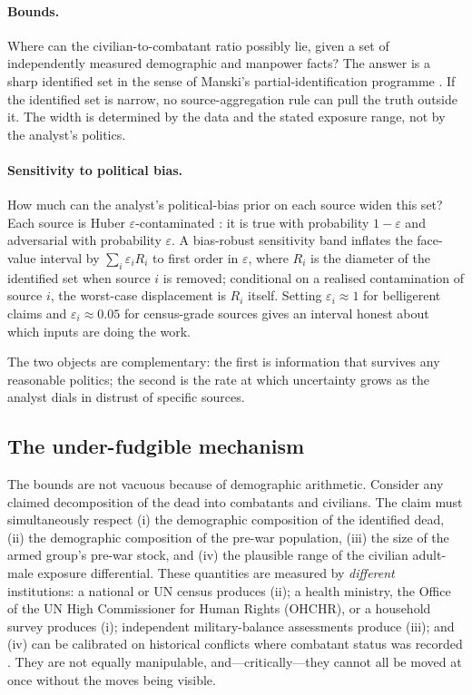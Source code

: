 \paragraph{Bounds.} Where can the civilian-to-combatant ratio possibly lie, given a set of independently measured demographic and manpower facts? The answer is a sharp identified set in the sense of Manski's partial-identification programme \citep{manski2003,tamer2010,romanoshaikh2010}. If the identified set is narrow, no source-aggregation rule can pull the truth outside it. The width is determined by the data and the stated exposure range, not by the analyst's politics.

\paragraph{Sensitivity to political bias.} How much can the analyst's political-bias prior on each source widen this set? Each source is Huber $\varepsilon$-contaminated \citep{huber1981,berger1986}: it is true with probability $1-\varepsilon$ and adversarial with probability $\varepsilon$. A bias-robust sensitivity band inflates the face-value interval by $\sum_i\varepsilon_i R_i$ to first order in $\varepsilon$, where $R_i$ is the diameter of the identified set when source $i$ is removed; conditional on a realised contamination of source $i$, the worst-case displacement is $R_i$ itself. Setting $\varepsilon_i\approx 1$ for belligerent claims and $\varepsilon_i\approx 0.05$ for census-grade sources gives an interval honest about which inputs are doing the work.

The two objects are complementary: the first is information that survives any reasonable politics; the second is the rate at which uncertainty grows as the analyst dials in distrust of specific sources.

\subsection{The under-fudgible mechanism}

The bounds are not vacuous because of demographic arithmetic. Consider any claimed decomposition of the dead into combatants and civilians. The claim must simultaneously respect (i) the demographic composition of the identified dead, (ii) the demographic composition of the pre-war population, (iii) the size of the armed group's pre-war stock, and (iv) the plausible range of the civilian adult-male exposure differential. These quantities are measured by \emph{different} institutions: a national or UN census produces (ii); a health ministry, the Office of the UN High Commissioner for Human Rights (OHCHR), or a household survey produces (i); independent military-balance assessments produce (iii); and (iv) can be calibrated on historical conflicts where combatant status was recorded \citep{frost2026}. They are not equally manipulable, and---critically---they cannot all be moved at once without the moves being visible.

